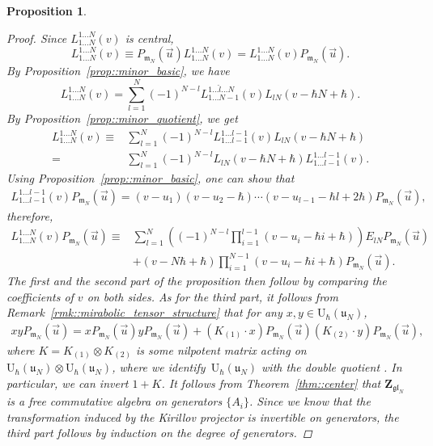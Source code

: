 \documentclass[10pt,a4paper]{article}
\numberwithin{equation}{section}
\newtheorem{Proposition}[Theorem]{Proposition}
{ \theoremstyle{definition}
	\newtheorem{Definition}[Theorem]{Definition}
	\newtheorem{Note}[Theorem]{Note}
	\newtheorem{Example}[Theorem]{Example}
	\newtheorem{Remark}[Theorem]{Remark} }
\newcommand{\U}{\mathrm{U}_{\hbar}}
\newcommand{\Z}{\mathbf{Z}}
\renewcommand{\b}{\mathfrak{b}}
\newcommand{\n}{\mathfrak{n}}
\renewcommand{\u}{\mathfrak{u}}
\newcommand{\m}{\mathfrak{m}}
\newcommand{\gl}{\mathfrak{gl}}
\begin{document}
\begin{Proposition}
\begin{proof}
			Since $L_{1\dots N}^{1\dots N}(v)$ is central,
			\[
			L_{1\dots N}^{1\dots N}(v) \equiv P_{\m_N} (\vec{u}) L_{1\dots N}^{1\dots N}(v) = L_{1\dots N}^{1\dots N}(v) P_{\m_N} (\vec{u}).
			\]
			By Proposition~\ref{prop::minor_basic}, we have
			\[
			L_{1\dots N}^{1\dots N}(v) = \sum\limits_{l=1}^N (-1)^{N-l} L_{1\dots N-1}^{1\dots \hat{l} \dots N}(v) L_{lN}(v-\hbar N+\hbar).
			\]
			By Proposition~\ref{prop::minor_quotient}, we get
			\begin{align*}
				L_{1\dots N}^{1\dots N}(v) \equiv{} &\sum\limits_{l=1}^N (-1)^{N-l} L_{1\dots l-1}^{1\dots l-1}(v) L_{lN}(v-\hbar N+\hbar) \\
				={}&\sum\limits_{l=1}^N (-1)^{N-l} L_{lN}(v-\hbar N+\hbar) L_{1\dots l-1}^{1\dots l-1}(v).
			\end{align*}
			Using Proposition~\ref{prop::minor_basic}, one can show that
			\begin{align*}
				L_{1\dots l-1}^{1\dots l-1}(v) P_{\m_N} (\vec{u})=(v-u_1) (v-u_2-\hbar) \cdots (v-u_{l-1} - \hbar l+2\hbar) P_{\m_N} (\vec{u}),
			\end{align*}
			therefore,
			\begin{align*}
					L_{1\dots N}^{1\dots N}(v) P_{\m_N} (\vec{u}) \equiv{}& \sum_{l=1}^N \left((-1)^{N-l} \prod_{i=1}^{l-1}(v-u_i - \hbar i+\hbar) \right) E_{lN} P_{\m_N} (\vec{u}) \\
					&+(v-N\hbar + \hbar)\prod_{i=1}^{N-1}(v - u_i -\hbar i + \hbar) P_{\m_N} (\vec{u}).
			\end{align*}
			The first and the second part of the proposition then follow by comparing the coefficients of $v$ on both sides. As for the third part, it follows from Remark~\ref{rmk::mirabolic_tensor_structure} that for any $x,y\in \U(\u_N)$,
			\begin{align*}
				xy P_{\m_N}(\vec{u}) = x P_{\m_N}(\vec{u}) y P_{\m_N}(\vec{u}) + (K_{(1)} \cdot x) P_{\m_N}(\vec{u}) (K_{(2)} \cdot y) P_{\m_N}(\vec{u}),
			\end{align*}
			where $K = K_{(1)} \otimes K_{(2)}$ is some nilpotent matrix acting on $\U(\u_N) \otimes \U(\u_N)$, where we identify~$\U(\u_N)$ with the double quotient \smash{$\n_-^{\psi} \backslash \U(\gl_N) / \b^{\vec{u}}$}. In particular, we can invert $1 + K$. It follows from Theorem~\ref{thm::center} that $\Z_{\gl_N}$ is a free commutative algebra on generators $\{A_i\}$. Since we know that the transformation induced by the Kirillov projector is invertible on generators, the third part follows by induction on the degree of generators.
		\end{proof}
	\end{Proposition}
	
\end{document}
